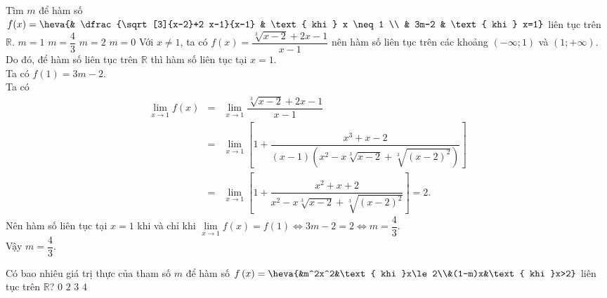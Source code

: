 \begin{ex}%
	Tìm $m$ để hàm số $f(x)=\heva{& \dfrac{\sqrt[3]{x-2}+2 x-1}{x-1} & \text { khi } x \neq 1 \\ & 3m-2 & \text { khi } x=1}$ liên tục trên $\mathbb{R}$.
	\choice
	{$m=1$}
	{\True $m=\dfrac{4}{3}$}
	{$m=2$}
	{$m=0$}
	\loigiai
	{
		Với $x\neq 1$, ta có $f(x)=\dfrac{\sqrt[3]{x-2}+2 x-1}{x-1}$ nên hàm số liên tục trên các khoảng $(-\infty;1)$ và $(1;+\infty)$.\\
		Do đó, để hàm số liên tục trên $\mathbb{R}$ thì hàm số liên tục tại $x=1$.\\
		Ta có $f(1)=3 m-2$.\\
		Ta có 
		\allowdisplaybreaks
		\begin{eqnarray*}
			\lim\limits_{x \rightarrow 1} f(x)
			& = & \lim\limits_{x \rightarrow 1} \dfrac{\sqrt[3]{x-2}+2 x-1}{x-1} \\
			& = & \lim\limits_{x \rightarrow 1}\left[1+\dfrac{x^{3}+x-2}{(x-1)\left(x^{2}-x \sqrt[3]{x-2}+\sqrt[3]{(x-2)^{2}}\right)}\right]\\
			& = & \lim\limits_{x \rightarrow 1}\left[1+\dfrac{x^{2}+x+2}{x^{2}-x \sqrt[3]{x-2}+\sqrt[3]{(x-2)^{2}}}\right]=2.
		\end{eqnarray*}
		Nên hàm số liên tục tại $x=1$ khi và chỉ khi 
		$\lim\limits_{x \rightarrow 1} f(x)=f(1) \Leftrightarrow 3 m-2=2 \Leftrightarrow m=\dfrac{4}{3}$.\\
		Vậy $m=\dfrac{4}{3}$.
	}
\end{ex}
\begin{ex}%
	Có bao nhiêu giá trị thực của tham số $m$ để hàm số $f\left(x\right)=\heva{&m^2x^2&\text{ khi }x\le 2\\&(1-m)x&\text{ khi }x>2}$ liên tục trên $\mathbb{R}$?
	\choice
	{$0$}
	{\True $2$}
	{$3$}
	{$4$}
\end{ex}
